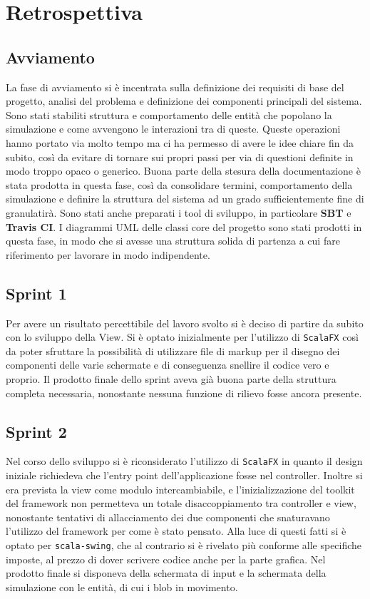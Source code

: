 \section{Retrospettiva}

\subsection{Avviamento}
La fase di avviamento si è incentrata sulla definizione dei requisiti di base del progetto, analisi del problema e definizione dei componenti principali del sistema. Sono stati stabiliti struttura e comportamento delle entità che popolano la simulazione e come avvengono le interazioni tra di queste. Queste operazioni hanno portato via molto tempo ma ci ha permesso di avere le idee chiare fin da subito, così da evitare di tornare sui propri passi per via di questioni definite in modo troppo opaco o generico. Buona parte della stesura della documentazione è stata prodotta in questa fase, così da consolidare termini, comportamento della simulazione e definire la struttura del sistema ad un grado sufficientemente fine di granulatirà. Sono stati anche preparati i tool di sviluppo, in particolare \textbf{SBT} e \textbf{Travis CI}. I diagrammi UML delle classi core del progetto sono stati prodotti in questa fase, in modo che si avesse una struttura solida di partenza a cui fare riferimento per lavorare in modo indipendente.

\subsection{Sprint 1}
Per avere un risultato percettibile del lavoro svolto si è deciso di partire da subito con lo sviluppo della View. Si è optato inizialmente per l'utilizzo di \texttt{ScalaFX} così da poter sfruttare la possibilità di utilizzare file di markup per il disegno dei componenti delle varie schermate e di conseguenza snellire il codice vero e proprio. Il prodotto finale dello sprint aveva già buona parte della struttura completa necessaria, nonostante nessuna funzione di rilievo fosse ancora presente.

\subsection{Sprint 2}
Nel corso dello sviluppo si è riconsiderato l'utilizzo di \texttt{ScalaFX} in quanto il design iniziale richiedeva che l'entry point dell'applicazione fosse nel controller. Inoltre si era prevista la view come modulo intercambiabile, e l'inizializzazione del toolkit del framework non permetteva un totale disaccoppiamento tra controller e view, nonostante tentativi di allacciamento dei due componenti che snaturavano l'utilizzo del framework per come è stato pensato. Alla luce di questi fatti si è optato per \texttt{scala-swing}, che al contrario si è rivelato più conforme alle specifiche imposte, al prezzo di dover scrivere codice anche per la parte grafica. Nel prodotto finale si disponeva della schermata di input e la schermata della simulazione con le entità, di cui i blob in movimento.


